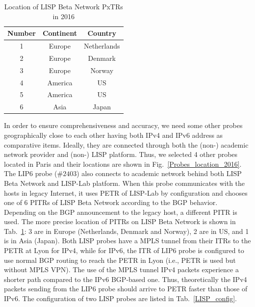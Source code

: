 \begin{table}[!tb]
	\centering
	\caption{Location of LISP Beta Network PxTRs in 2016}
	\label{PxTR_loc_2016}{
		\begin{tabular}{@{}c|c|c@{}}
			\hline\hline
			Number & Continent  & Country   \\ \hline
			1 & Europe & Netherlands     	\\  \hline     
			2 & Europe & Denmark     	\\  \hline
			3 & Europe & Norway     	\\  \hline 
			4 & America & US     	\\  \hline      
			5 & America & US     	\\  \hline         
			6 & Asia & Japan     	\\  \hline  \hline                      
		\end{tabular}
	}
\end{table}
In order to ensure comprehensiveness and accuracy, we need some other probes geographically close to each other having both IPv4 and IPv6 address as comparative items. Ideally, they are connected through both the (non-) academic network provider and (non-) LISP platform. Thus, we selected 4 other probes located in Paris and their locations are shown in Fig.~\ref{Probes_location_2016}. The LIP6 probe ($\#2403$) also connects to academic network behind both LISP Beta Network and LISP-Lab platform. When this probe communicates with the hosts in legacy Internet, it uses PETR of LISP-Lab by configuration and chooses one of 6 PITRs of LISP Beta Network according to the BGP behavior. Depending on the BGP announcement to the legacy host, a different PITR is used. The more precise location of PITRs on LISP Beta Network is shown in Tab.~\ref{PxTR_loc_2016}: 3 are in Europe (Netherlands, Denmark and Norway), 2 are in US, and 1 is in Asia (Japan). Both LISP probes have a MPLS tunnel from their ITRs to the PETR at Lyon for IPv4, while for IPv6, the ITR of LIP6 probe is configured to use normal BGP routing to reach the PETR in Lyon (i.e., PETR is used but without MPLS VPN). The use of the MPLS tunnel IPv4 packets experience a shorter path compared to the IPv6 BGP-based one. Thus, theoretically the IPv4 packets sending from the LIP6 probe should arrive to PETR faster than those of IPv6. The configuration of two LISP probes are listed in Tab.~\ref{LISP_config}. 

